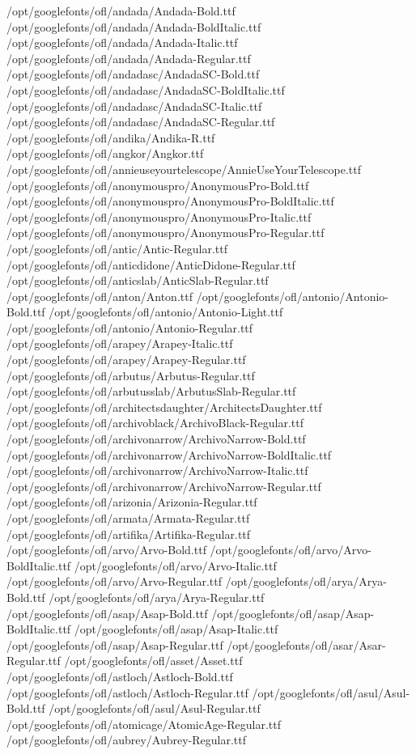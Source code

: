 /opt/googlefonts/ofl/andada/Andada-Bold.ttf
/opt/googlefonts/ofl/andada/Andada-BoldItalic.ttf
/opt/googlefonts/ofl/andada/Andada-Italic.ttf
/opt/googlefonts/ofl/andada/Andada-Regular.ttf
/opt/googlefonts/ofl/andadasc/AndadaSC-Bold.ttf
/opt/googlefonts/ofl/andadasc/AndadaSC-BoldItalic.ttf
/opt/googlefonts/ofl/andadasc/AndadaSC-Italic.ttf
/opt/googlefonts/ofl/andadasc/AndadaSC-Regular.ttf
/opt/googlefonts/ofl/andika/Andika-R.ttf
/opt/googlefonts/ofl/angkor/Angkor.ttf
/opt/googlefonts/ofl/annieuseyourtelescope/AnnieUseYourTelescope.ttf
/opt/googlefonts/ofl/anonymouspro/AnonymousPro-Bold.ttf
/opt/googlefonts/ofl/anonymouspro/AnonymousPro-BoldItalic.ttf
/opt/googlefonts/ofl/anonymouspro/AnonymousPro-Italic.ttf
/opt/googlefonts/ofl/anonymouspro/AnonymousPro-Regular.ttf
/opt/googlefonts/ofl/antic/Antic-Regular.ttf
/opt/googlefonts/ofl/anticdidone/AnticDidone-Regular.ttf
/opt/googlefonts/ofl/anticslab/AnticSlab-Regular.ttf
/opt/googlefonts/ofl/anton/Anton.ttf
/opt/googlefonts/ofl/antonio/Antonio-Bold.ttf
/opt/googlefonts/ofl/antonio/Antonio-Light.ttf
/opt/googlefonts/ofl/antonio/Antonio-Regular.ttf
/opt/googlefonts/ofl/arapey/Arapey-Italic.ttf
/opt/googlefonts/ofl/arapey/Arapey-Regular.ttf
/opt/googlefonts/ofl/arbutus/Arbutus-Regular.ttf
/opt/googlefonts/ofl/arbutusslab/ArbutusSlab-Regular.ttf
/opt/googlefonts/ofl/architectsdaughter/ArchitectsDaughter.ttf
/opt/googlefonts/ofl/archivoblack/ArchivoBlack-Regular.ttf
/opt/googlefonts/ofl/archivonarrow/ArchivoNarrow-Bold.ttf
/opt/googlefonts/ofl/archivonarrow/ArchivoNarrow-BoldItalic.ttf
/opt/googlefonts/ofl/archivonarrow/ArchivoNarrow-Italic.ttf
/opt/googlefonts/ofl/archivonarrow/ArchivoNarrow-Regular.ttf
/opt/googlefonts/ofl/arizonia/Arizonia-Regular.ttf
/opt/googlefonts/ofl/armata/Armata-Regular.ttf
/opt/googlefonts/ofl/artifika/Artifika-Regular.ttf
/opt/googlefonts/ofl/arvo/Arvo-Bold.ttf
/opt/googlefonts/ofl/arvo/Arvo-BoldItalic.ttf
/opt/googlefonts/ofl/arvo/Arvo-Italic.ttf
/opt/googlefonts/ofl/arvo/Arvo-Regular.ttf
/opt/googlefonts/ofl/arya/Arya-Bold.ttf
/opt/googlefonts/ofl/arya/Arya-Regular.ttf
/opt/googlefonts/ofl/asap/Asap-Bold.ttf
/opt/googlefonts/ofl/asap/Asap-BoldItalic.ttf
/opt/googlefonts/ofl/asap/Asap-Italic.ttf
/opt/googlefonts/ofl/asap/Asap-Regular.ttf
/opt/googlefonts/ofl/asar/Asar-Regular.ttf
/opt/googlefonts/ofl/asset/Asset.ttf
/opt/googlefonts/ofl/astloch/Astloch-Bold.ttf
/opt/googlefonts/ofl/astloch/Astloch-Regular.ttf
/opt/googlefonts/ofl/asul/Asul-Bold.ttf
/opt/googlefonts/ofl/asul/Asul-Regular.ttf
/opt/googlefonts/ofl/atomicage/AtomicAge-Regular.ttf
/opt/googlefonts/ofl/aubrey/Aubrey-Regular.ttf

